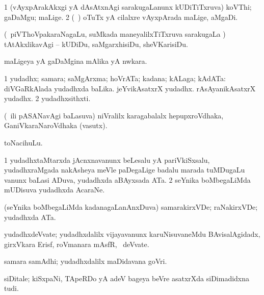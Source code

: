 \bentry
{} 
\gl{\nA}
\expl{}
\bmng
\bnum
\num{1} (vAyxpArakAkxgi yA dAsAtxnAgi sarakugaLanunx kUDiTiTxruva) koVThi; gaDaMgu; maLige. 
\num{2} (\kanmu\ \birx) oTuTx yA cilalxre vAyxpArada maLige, aMgaDi. 
\enum
\emng
\eentry

\bentry
{} 
\gl{\sakirx}
\expl{}
\bmng
(\kanmu\ piVThoVpakaraNagaLu, suMkada maneyalilxTiTxruva sarakugaLa \vi) tAtAkxlikavAgi -- kUDiDu, saMgarxhisiDu, sheVKarisiDu. 
\emng
\eentry

\bentry
{} 
\gl{\nA}
\bmng
maLigeya yA gaDaMgina mAlika yA nwkara. 
\emng
\eentry

\bentry
{} 
\gl{\nA}
\expl{}
\bmng
\bnum
\num{1} yudadhx; samara; saMgArxma; hoVrATa; kadana; kALaga; kAdATa:  diVGaRkAlada yudadhxda baLika.  jeYvikAsatxrX yudadhx.  rAsAyanikAsatxrX yudadhx. 
\num{2} yudadhxsithxti. 
\enum
\emng
\eentry

\bentry
{} 
\gl{\nA}
\expl{}
\bmng
(\kanmu\ ili pASANavAgi baLasuva) niVralilx karagabalalx hepupxroVdhaka, GaniVkaraNaroVdhaka (vasutx). 
\emng
\eentry

\bentry
{} 
\gl{\nA}
\expl{}
\bmng
toNacihuLu. 
\emng
\eentry

\bentry
{} 
\gl{\nA}
\expl{}
\bmng
\bnum
\num{1} yudadhxtaMtarxda jAcnxnavanunx beLesalu yA pariVkiSxsalu, yudadhxraMgada nakAsheya meVle paDegaLige badalu marada tuMDugaLu \mo vanunx baLasi ADuva, yudadhxda aBAyxsada ATa. 
\num{2} seYnika boMbegaLiMda mUDisuva yudadhxda AcaraNe. 
\enum
\emng
\eentry

\bentry
{} 
\gl{\nA}
\expl{}
\bmng
(seYnika boMbegaLiMda kadanagaLanAnxDuva) samarakirxVDe; raNakirxVDe; yudadhxda ATa. 
\emng
\eentry

\bentry
{} 
\gl{\nA}
\expl{}
\bmng
yudadhxdeVvate; yudadhxdalilx vijayavanunx karuNisuvaneMdu BAvisalAgidadx, girxVkara Erisf, roVmanara mAsfR, \mo\ deVvate. 
\emng
\eentry

\bentry
{} 
\gl{\nA}
\expl{}
\bmng
samara samAdhi; yudadhxdalilx maDidavana goVri. 
\emng
\eentry

\bentry
{} 
\gl{\nA}
\expl{}
\bmng
siDitale; kiSxpaNi, TApeRDo yA adeV bageya beVre asatxrXda siDimadidxna tudi. 
\emng
\eentry

